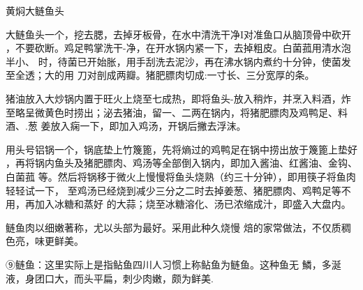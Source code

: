 \begin{recipe}{黄焖大鲢鱼头}

\ingredients


\preparation

\step 大鲢鱼头一个，挖去腮，去掉牙板骨，在水中清洗干净I对准鱼口从脑顶骨中砍开
，不要砍断。鸡足鸭掌洗干-净，在开水锅内紧一下，去掉粗皮。白菌菰用清水泡半小、
时，待菌已开始胀，用手刮洗去泥沙，再在沸水锅内煮约十分钟，使菌发至全透；大的用
刀对剖成两瓣。猪肥膘肉切成:一寸长、三分宽厚的条。

\step 猪油放入大炒锅内置于旺火上烧至七成热，即将鱼头-放入稍炸，并烹入料酒，炸
至略呈微黄色时捞出；泌去猪油，留一、二两在锅内，将猪肥膘肉及鸡鸭足、料酒、.葱
姜放入痫一下，即加入鸡汤，开锅后撇去浮沫。

\step 用头号铝锅一个，锅底垫上竹篾篦，先将熵过的鸡鸭足在锅中捞出放于篾篦上垫好
，再将锅内鱼头及猪肥膘肉、鸡汤等全部倒入锅内，即加入酱油、红酱油、金钩、白菌菰
等。然后将锅移于微火上慢慢将鱼头烧熟（约三十分钟），即用筷子将鱼肉轻轻试一下，
至鸡汤已经烧到减少三分之二时去掉姜葱、猪肥膘肉、鸡鸭足等不用，再加入冰糖和蒸好
的大蒜；烧至冰糖溶化、汤已浓缩成汁，即盛入大盘内。

\features

鲢鱼肉以细嫩著称，尤以头部为最好。采用此种久烧慢 焙的家常做法，不仅质稠色亮，味更鲜美。

⑨鲢鱼：这里实际上是指鲇鱼四川人习惯上称鲇鱼为鲢鱼。这种鱼无 鱗，多涎液，身团口大，而头平扁，刺少肉嫩，颇为鲜美.

\end{recipe}

